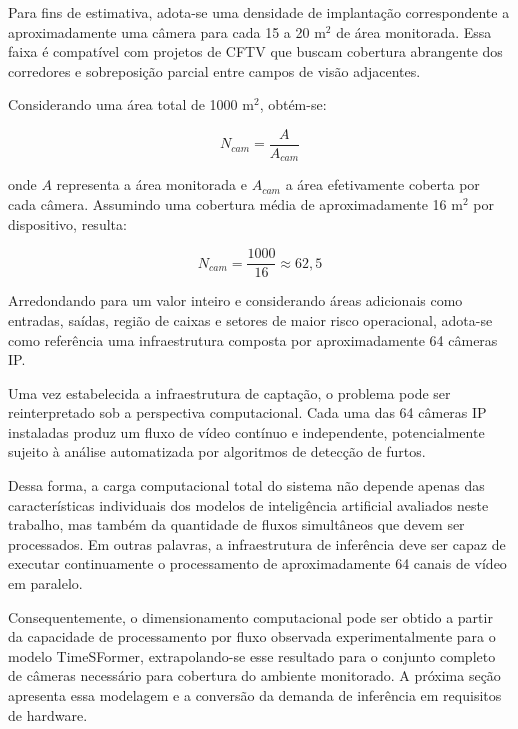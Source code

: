 \documentclass[12pt, %
openright, 
oneside, %
a4paper,    %
brazil]{facom-ufu-abntex2}
\begin{document}
Para fins de estimativa, adota-se uma densidade de implantação correspondente a aproximadamente uma câmera para cada 15 a 20 m$^2$ de área monitorada. Essa faixa é compatível com projetos de CFTV que buscam cobertura abrangente dos corredores e sobreposição parcial entre campos de visão adjacentes.

Considerando uma área total de 1000 m$^2$, obtém-se:

\begin{equation}
N_{cam} = \frac{A}{A_{cam}}
\end{equation}

onde $A$ representa a área monitorada e $A_{cam}$ a área efetivamente coberta por cada câmera. Assumindo uma cobertura média de aproximadamente 16 m$^2$ por dispositivo, resulta:

\begin{equation}
N_{cam} = \frac{1000}{16} \approx 62,5
\end{equation}

Arredondando para um valor inteiro e considerando áreas adicionais como entradas, saídas, região de caixas e setores de maior risco operacional, adota-se como referência uma infraestrutura composta por aproximadamente 64 câmeras IP.

Uma vez estabelecida a infraestrutura de captação, o problema pode ser reinterpretado sob a perspectiva computacional. Cada uma das 64 câmeras IP instaladas produz um fluxo de vídeo contínuo e independente, potencialmente sujeito à análise automatizada por algoritmos de detecção de furtos.

Dessa forma, a carga computacional total do sistema não depende apenas das características individuais dos modelos de inteligência artificial avaliados neste trabalho, mas também da quantidade de fluxos simultâneos que devem ser processados. Em outras palavras, a infraestrutura de inferência deve ser capaz de executar continuamente o processamento de aproximadamente 64 canais de vídeo em paralelo.

Consequentemente, o dimensionamento computacional pode ser obtido a partir da capacidade de processamento por fluxo observada experimentalmente para o modelo TimeSFormer, extrapolando-se esse resultado para o conjunto completo de câmeras necessário para cobertura do ambiente monitorado. A próxima seção apresenta essa modelagem e a conversão da demanda de inferência em requisitos de hardware.
\end{document}

